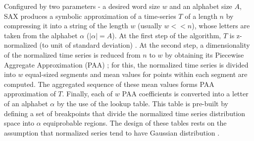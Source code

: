 \documentclass[conference]{IEEEtran}
\begin{document}

Configured by two parameters - a desired word size $w$ and an alphabet size $A$,
SAX produces a symbolic approximation of a time-series $T$ of a length $n$ by compressing 
it into a string of the length $w$ (usually $w<<n$), whose letters are taken from 
the alphabet $\alpha$ ($|\alpha|=A$). 
At the first step of the algorithm, $T$ is z-normalized (to unit of standard deviation)
\cite{goldin_kanellakis}. 
At the second step, a dimensionality of the normalized time series is reduced from $n$ to $w$ by
obtaining its Piecewise Aggregate Approximation (PAA) \cite{paa}; for this, the normalized time
series is
divided into $w$ equal-sized segments and mean values for points within each segment are computed.
The aggregated sequence of these mean values forms PAA approximation of $T$. Finally, each of $w$
PAA coefficients is converted into a letter of an alphabet $\alpha$ by the use of the lookup table.
This table is pre-built by defining a set of breakpoints that divide the normalized time series
distribution 
space into $\alpha$ equiprobable regions. The design of these tables rests on the assumption 
that normalized series tend to have Gaussian distribution \cite{larsen_marx}.
\end{document}
